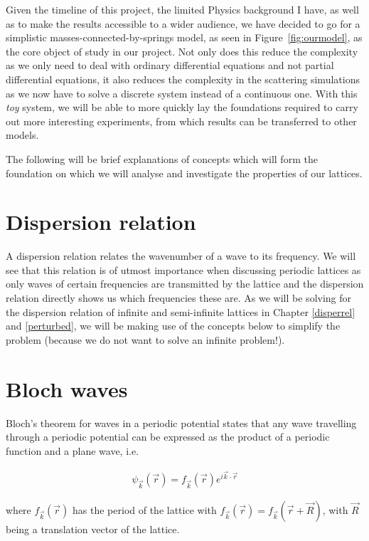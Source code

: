 Given the timeline of this project, the limited Physics background I have, as
well as to make the results accessible to a wider audience, we have decided to
go for a simplistic masses-connected-by-springs model, as seen in
Figure~\ref{fig:ourmodel}, as the core object of study in our project. Not only
does this reduce the complexity as we only need to deal with ordinary
differential equations and not partial differential equations, it also reduces
the complexity in the scattering simulations as we now have to solve a discrete
system instead of a continuous one. With this \textit{toy} system, we will be
able to more quickly lay the foundations required to carry out more interesting
experiments, from which results can be transferred to other models.

The following will be brief explanations of concepts which will form the
foundation on which we will analyse and investigate the properties of our
lattices.

\section{Dispersion relation}
\label{disperbg}
A dispersion relation relates the wavenumber of a wave to its frequency. We
will see that this relation is of utmost importance when discussing periodic
lattices as only waves of certain frequencies are transmitted by the lattice
and the dispersion relation directly shows us which frequencies these are. As
we will be solving for the dispersion relation of infinite and semi-infinite
lattices in Chapter \ref{disperrel} and \ref{perturbed}, we will be making use
of the concepts below to simplify the problem (because we do not want to solve
an infinite problem!).

\section{Bloch waves}
\label{blochbg}
Bloch's theorem for waves in a periodic potential\cite{bloch} states that any
wave travelling through a periodic potential can be expressed as the product of
a periodic function and a plane wave,\cite{kittel} i.e.

\begin{align}
  \psi_{\vec{k}}(\vec{r})=f_{\vec{k}}(\vec{r})e^{i\vec{k}\cdot\vec{r}}
\end{align}

where $f_{\vec{k}}(\vec{r})$ has the period of the lattice with
$f_{\vec{k}}(\vec{r})=f_{\vec{k}}(\vec{r}+\vec{R})$, with $\vec{R}$ being a
translation vector of the lattice.

